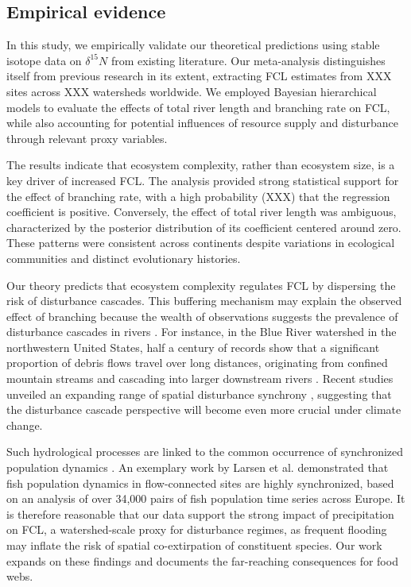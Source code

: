 \documentclass[11pt, class=article, crop=false]{standalone}
\begin{document}
\subsection{Empirical evidence}

In this study, we empirically validate our theoretical predictions using stable isotope data on $\delta^{15}N$ from existing literature.
Our meta-analysis distinguishes itself from previous research in its extent, extracting FCL estimates from XXX sites across XXX watersheds worldwide.
We employed Bayesian hierarchical models to evaluate the effects of total river length and branching rate on FCL, while also accounting for potential influences of resource supply and disturbance through relevant proxy variables.

The results indicate that ecosystem complexity, rather than ecosystem size, is a key driver of increased FCL.
The analysis provided strong statistical support for the effect of branching rate, with a high probability (XXX) that the regression coefficient is positive.
Conversely, the effect of total river length was ambiguous, characterized by the posterior distribution of its coefficient centered around zero.
These patterns were consistent across continents despite variations in ecological communities and distinct evolutionary histories. 

Our theory predicts that ecosystem complexity regulates FCL by dispersing the risk of disturbance cascades.
This buffering mechanism may explain the observed effect of branching because the wealth of observations suggests the prevalence of disturbance cascades in rivers \citep{swanson_flood_1998, nakamura_disturbance_2000, berghuijs_growing_2019, sarremejane_drought_2021, sharma_spatial_2024}.
For instance, in the Blue River watershed in the northwestern United States, half a century of records show that a significant proportion of debris flows travel over long distances, originating from confined mountain streams and cascading into larger downstream rivers \citep{nakamura_disturbance_2000}.
Recent studies unveiled an expanding range of spatial disturbance synchrony \citep{berghuijs_growing_2019, sharma_spatial_2024}, suggesting that the disturbance cascade perspective will become even more crucial under climate change.

Such hydrological processes are linked to the common occurrence of synchronized population dynamics \citep{sarremejane_drought_2021, larsen_geography_2021}.
An exemplary work by Larsen et al. \citep{larsen_geography_2021} demonstrated that fish population dynamics in flow-connected sites are highly synchronized, based on an analysis of over 34,000 pairs of fish population time series across Europe.
It is therefore reasonable that our data support the strong impact of precipitation on FCL, a watershed-scale proxy for disturbance regimes, as frequent flooding may inflate the risk of spatial co-extirpation of constituent species.
Our work expands on these findings and documents the far-reaching consequences for food webs.
\end{document}
